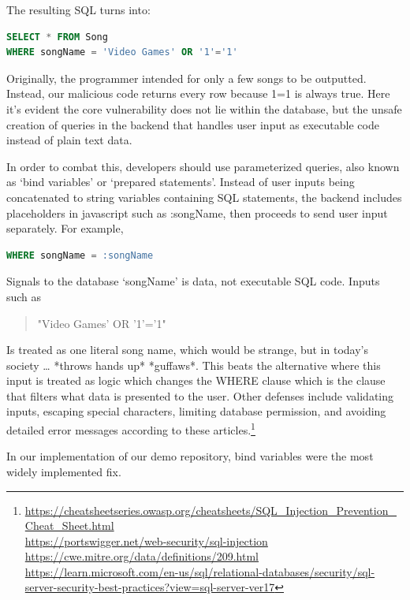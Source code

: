 \documentclass[12pt]{article}
\begin{document}
The resulting SQL turns into:

\begin{lstlisting}[language=SQL]
SELECT * FROM Song
WHERE songName = 'Video Games' OR '1'='1'
\end{lstlisting}

Originally, the programmer intended for only a few songs to be outputted. Instead, our malicious code returns every row because 1=1 is always true. Here it’s evident the core vulnerability does not lie within the database, but the unsafe creation of queries in the backend that handles user input as executable code instead of plain text data.

In order to combat this, developers should use parameterized queries, also known as ‘bind variables’ or ‘prepared statements’. Instead of user inputs being concatenated to string variables containing SQL statements, the backend includes placeholders in javascript such as :songName, then proceeds to send user input separately. For example,

\begin{lstlisting}[language=SQL]
WHERE songName = :songName
\end{lstlisting}

Signals to the database ‘songName’ is data, not executable SQL code. Inputs such as

\begin{quote}
"Video Games' OR '1'='1"
\end{quote}

Is treated as one literal song name, which would be strange, but in today’s society … *throws hands up* *guffaws*. This beats the alternative where this input is treated as logic which changes the WHERE clause which is the clause that filters what data is presented to the user. Other defenses include validating inputs, escaping special characters, limiting database permission, and avoiding detailed error messages according to these articles.\footnote{
\url{https://cheatsheetseries.owasp.org/cheatsheets/SQL_Injection_Prevention_Cheat_Sheet.html}
\\
\url{https://portswigger.net/web-security/sql-injection}
\\
\url{https://cwe.mitre.org/data/definitions/209.html}
\\
\url{https://learn.microsoft.com/en-us/sql/relational-databases/security/sql-server-security-best-practices?view=sql-server-ver17}
}

In our implementation of our demo repository, bind variables were the most widely implemented fix.
\end{document}
